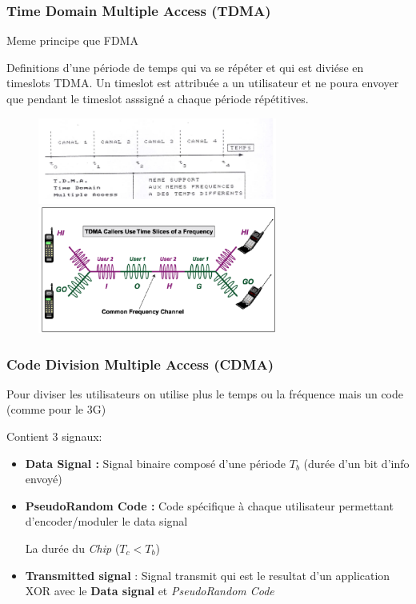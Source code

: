 		\subsubsection{Time Domain Multiple Access (TDMA)}
			Meme principe que FDMA
			
			Definitions d'une période de temps qui va se répéter et  qui est diviése en timeslots TDMA. Un timeslot est attribuée a un utilisateur et ne poura envoyer que pendant le timeslot asssigné a chaque période répétitives.
			
			\begin{figure}[htp]
				\centering
				\includegraphics[width=0.7\textwidth]{img/TDMA.png}
				\includegraphics[width=0.7\textwidth]{img/TDMA1.png}
			\end{figure}
		\subsubsection{Code Division Multiple Access (CDMA)}
		
			Pour diviser les utilisateurs  on utilise plus le temps ou la fréquence mais un code (comme pour le 3G)
			
			Contient 3 signaux:
			\begin{itemize}
				\item \textbf{Data Signal :} Signal binaire composé d'une période $T_b$ (durée d'un bit d'info envoyé)
				\item \textbf{PseudoRandom Code :} Code spécifique à chaque utilisateur permettant d'encoder/moduler le data signal
				
				La durée du \textit{Chip} ($T_c < T_b$)
				\item \textbf{Transmitted signal} : Signal transmit qui est le resultat d'un application XOR avec le \textbf{Data signal} et \textit{PseudoRandom Code}
			\end{itemize}
			
